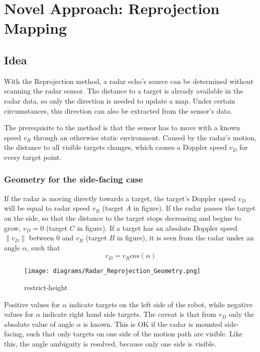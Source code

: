 
\chapter{Novel Approach: Reprojection
Mapping}\label{novel-approach-reprojection-mapping}

\section{Idea}\label{idea}

With the Reprojection method, a radar echo's source can be determined
without scanning the radar sensor. The distance to a target is already
available in the radar data, so only the direction is needed to update a
map. Under certain circumstances, this direction can also be extracted
from the sensor's data.

The prerequisite to the method is that the sensor has to move with a
known speed \(v_R\) through an otherwise static environment. Caused by
the radar's motion, the distance to all visible targets changes, which
causes a Doppler speed \(v_D\) for every target point.

\subsection{Geometry for the side-facing
case}\label{geometry-for-the-side-facing-case}

If the radar is moving directly towards a target, the target's Doppler
speed \(v_D\) will be equal to radar speed \(v_R\) (target \(A\) in
figure). If the radar passes the target on the side, so that the
distance to the target stops decreasing and begins to grow, \(v_D = 0\)
(target \(C\) in figure). If a target has an absolute Doppler speed
\(\|v_D\|\) between \(0\) and \(v_R\) (target \(B\) in figure), it is seen
from the radar under an angle \(\alpha\), such that
\[v_D = v_R cos(\alpha)\]

\begin{figure}
\centering
\texttt{[image: diagrams/Radar\_Reprojection\_Geometry.png]}
\caption{restrict-height}
\end{figure}

Positive values for \(\alpha\) indicate targets on the left side of the
robot, while negative values for \(\alpha\) indicate right hand side
targets. The caveat is that from \(v_D\) only the absolute value of
angle \(\alpha\) is known. This is OK if the radar is mounted
side-facing, such that only targets on one side of the motion path are
visible. Like this, the angle ambiguity is resolved, because only one
side is visible.


